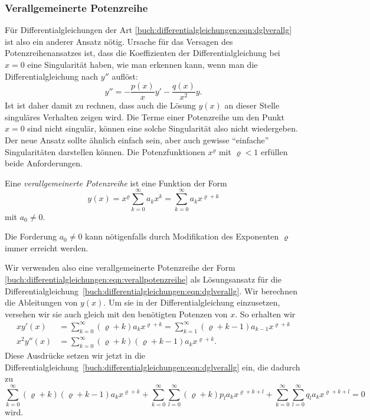 %
%
\subsubsection{Verallgemeinerte Potenzreihe}
Für Differentialgleichungen der Art
\eqref{buch:differentialgleichungen:eqn:dglverallg}
ist also ein anderer Ansatz nötig.
Ursache für das Versagen des Potenzreihenansatzes ist, dass die
Koeffizienten der Differentialgleichung bei $x=0$ eine
Singularität haben, wie man erkennen kann, wenn man die
Differentialgleichung nach $y''$ auflöst:
\[
y'' = -\frac{p(x)}{x}y' - \frac{q(x)}{x^2}y.
\]
Ist ist daher damit zu rechnen, dass auch die Lösung $y(x)$ an dieser
Stelle singuläres Verhalten zeigen wird.
Die Terme einer Potenzreihe um den Punkt $x=0$ sind nicht singulär,
können eine solche Singularität also nicht wiedergeben.
Der neue Ansatz sollte ähnlich einfach sein, aber auch gewisse ``einfache''
Singularitäten darstellen können.
Die Potenzfunktionen $x^\varrho$ mit $\varrho<1$ erfüllen beide
Anforderungen.

\begin{definition}
\label{buch:differentialgleichungen:def:verallpotenzreihe}
Eine {\em verallgemeinerte Potenzreihe} ist eine Funktion der Form
\begin{equation}
y(x)
=
x^\varrho \sum_{k=0}^\infty a_kx^k
=
\sum_{k=0}^\infty a_k x^{\varrho+k}
\label{buch:differentialgleichungen:eqn:verallpotenzreihe}
\end{equation}
mit $a_0\ne 0$.
\end{definition}

Die Forderung $a_0\ne 0$ kann nötigenfalls durch Modifikation des
Exponenten $\varrho$ immer erreicht werden.

Wir verwenden also eine verallgemeinerte Potenzreihe der Form
\eqref{buch:differentialgleichungen:eqn:verallpotenzreihe}
als Lösungsansatz für die
Differentialgleichung~\eqref{buch:differentialgleichungen:eqn:dglverallg}.
Wir berechnen die Ableitungen von $y(x)$. Um sie in der
Differentialgleichung einzusetzen, versehen wir sie auch gleich mit den
benötigten Potenzen von $x$.
So erhalten wir
\begin{align*}
xy'(x)
&=
\sum_{k=0}^\infty
(\varrho+k)a_kx^{\varrho+k}
=
\sum_{k=1}^\infty
(\varrho+k-1)a_{k-1}x^{\varrho+k}
\\
x^2y''(x)
&=
\sum_{k=0}^\infty
(\varrho+k)(\varrho+k-1)a_kx^{\varrho+k}.
\end{align*}
Diese Ausdrücke setzen wir jetzt in die 
Differentialgleichung~\eqref{buch:differentialgleichungen:eqn:dglverallg}
ein, die dadurch zu
\begin{equation}
\sum_{k=0}^\infty  (\varrho+k)(\varrho+k-1) a_k x^{\varrho+k}
+
\sum_{k=0}^\infty \sum_{l=0}^\infty (\varrho+k) p_l a_kx^{\varrho+k+l}
+
\sum_{k=0}^\infty \sum_{l=0}^\infty q_l a_k x^{\varrho+k+l}
=
0
\label{buch:differentialgleichungen:eqn:veralgpotenzsumme}
\end{equation}
wird.

